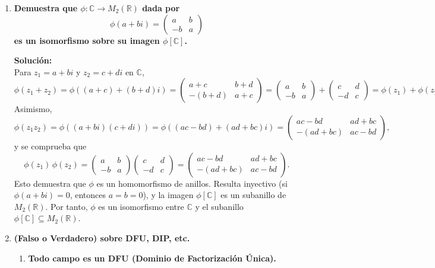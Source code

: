 \documentclass[12pt]{article}
\theoremstyle{definition}
\theoremstyle{remark}
\begin{document}
\begin{enumerate}[label=\textbf{\arabic*.}]
\item \textbf{Demuestra que $\phi : \mathbb{C} \rightarrow M_2(\mathbb{R})$ dada por 
\[
\phi(a + bi) = \begin{pmatrix} a & b \\ -b & a \end{pmatrix}
\]
es un isomorfismo sobre su imagen $\phi[\mathbb{C}]$.}

\textbf{Solución:}\\
Para $z_1 = a+bi$ y $z_2 = c+di$ en $\mathbb{C}$,
\[
\phi(z_1 + z_2) 
= \phi((a+c) + (b+d)i) 
= \begin{pmatrix} a+c & b+d \\ -(b+d) & a+c \end{pmatrix}
= \begin{pmatrix} a & b \\ -b & a \end{pmatrix}
 + \begin{pmatrix} c & d \\ -d & c \end{pmatrix}
= \phi(z_1) + \phi(z_2).
\]
Asimismo,
\[
\phi(z_1 z_2) 
= \phi((a+bi)(c+di)) 
= \phi((ac-bd) + (ad+bc)i)
= \begin{pmatrix} ac-bd & ad+bc \\ -(ad+bc) & ac-bd \end{pmatrix},
\]
y se comprueba que 
\[
\phi(z_1)\,\phi(z_2)
= \begin{pmatrix} a & b \\ -b & a \end{pmatrix}
  \begin{pmatrix} c & d \\ -d & c \end{pmatrix}
= \begin{pmatrix} ac-bd & ad+bc \\ -(ad+bc) & ac-bd \end{pmatrix}.
\]
Esto demuestra que $\phi$ es un homomorfismo de anillos. Resulta inyectivo (si $\phi(a+bi) = 0$, entonces $a=b=0$), y la imagen $\phi[\mathbb{C}]$ es un subanillo de $M_2(\mathbb{R})$. Por tanto, $\phi$ es un isomorfismo entre $\mathbb{C}$ y el subanillo \(\phi[\mathbb{C}]\subseteq M_2(\mathbb{R})\).


\item \textbf{(Falso o Verdadero) sobre DFU, DIP, etc.}

\begin{enumerate}[label=(\alph*)]
\item \textbf{Todo campo es un DFU (Dominio de Factorización Única).}  


\end{enumerate}
\end{enumerate}
\end{document}
